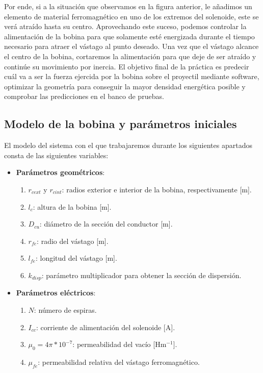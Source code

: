 Por ende, si a la situación que observamos en la figura anterior, le añadimos un elemento de material ferromagnético en uno de los extremos del solenoide, este se verá atraído hasta su centro. Aprovechando este suceso, podemos controlar la alimentación de la bobina para que solamente esté energizada durante el tiempo necesario para atraer el vástago al punto deseado. Una vez que el vástago alcance el centro de la bobina, cortaremos la alimentación para que deje de ser atraído y continúe su movimiento por inercia. El objetivo final de la práctica es predecir cuál va a ser la fuerza ejercida por la bobina sobre el proyectil mediante software, optimizar la geometría para conseguir la mayor densidad energética posible y comprobar las predicciones en el banco de pruebas.

\subsection*{Modelo de la bobina y parámetros iniciales}

El modelo del sistema con el que trabajaremos durante los siguientes apartados consta de las siguientes variables:

\begin{itemize}
    \item \textbf{Parámetros geométricos}:
    \begin{enumerate}[label=\alph*., leftmargin=*, itemindent=1em]
        \item \(r_{cext}\) y \(r_{cint} \): radios exterior e interior de la bobina, respectivamente [m].
        \item \(l_c\): altura de la bobina [m].
        \item \(D_{cu}\): diámetro de la sección del conductor [m].
        \item \(r_{fe}\): radio del vástago [m].
        \item \(l_{fe}\): longitud del vástago [m].
        \item \(k_{disp}\): parámetro multiplicador para obtener la sección de dispersión.
    \end{enumerate}
    \item \textbf{Parámetros eléctricos}:
    \begin{enumerate}[label=\alph*., leftmargin=*, itemindent=1em]
        \item \(N\): número de espiras.
        \item \(I_{cc}\): corriente de alimentación del solenoide [A].
        \item \(\mu_0 = 4\pi*10^{-7}\): permeabilidad del vacío [Hm\(^{-1}\)]. 
        \item \(\mu_{fe}\): permeabilidad relativa del vástago ferromagnético.
    \end{enumerate}
\end{itemize}


